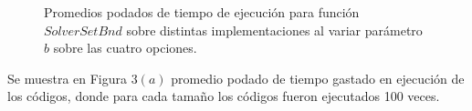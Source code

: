  \begin{figure}[htbp]
\centering


\caption{Promedios podados de tiempo de ejecución para función $Solver Set Bnd$ sobre distintas implementaciones al variar parámetro $b$ sobre las cuatro opciones.} \label{fig:lego}
\end{figure}



Se muestra en Figura 3$(a)$ promedio podado de tiempo gastado en ejecución de los códigos, donde para cada tamaño los códigos fueron ejecutados 100 veces.
 

